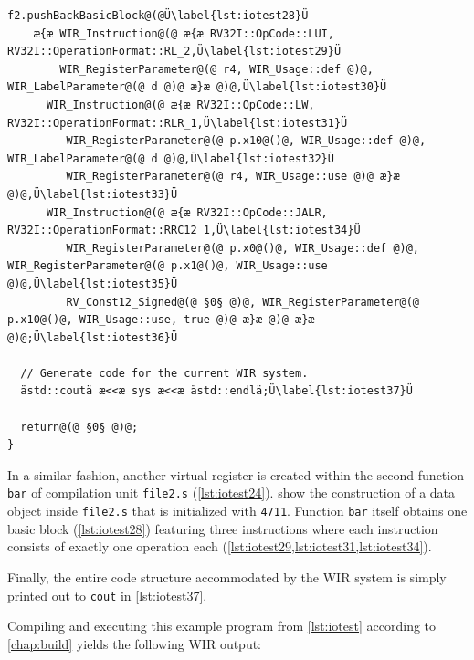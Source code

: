 \begin{lstlisting}[style=code,float=!ht,caption={Simple WIR Program Showing Stream Output},label=lst:iotest]
  f2.pushBackBasicBlock@(@Ü\label{lst:iotest28}Ü
    æ{æ WIR_Instruction@(@ æ{æ RV32I::OpCode::LUI, RV32I::OperationFormat::RL_2,Ü\label{lst:iotest29}Ü
        WIR_RegisterParameter@(@ r4, WIR_Usage::def @)@, WIR_LabelParameter@(@ d @)@ æ}æ @)@,Ü\label{lst:iotest30}Ü
      WIR_Instruction@(@ æ{æ RV32I::OpCode::LW, RV32I::OperationFormat::RLR_1,Ü\label{lst:iotest31}Ü
         WIR_RegisterParameter@(@ p.x10@()@, WIR_Usage::def @)@, WIR_LabelParameter@(@ d @)@,Ü\label{lst:iotest32}Ü
         WIR_RegisterParameter@(@ r4, WIR_Usage::use @)@ æ}æ @)@,Ü\label{lst:iotest33}Ü
      WIR_Instruction@(@ æ{æ RV32I::OpCode::JALR, RV32I::OperationFormat::RRC12_1,Ü\label{lst:iotest34}Ü
         WIR_RegisterParameter@(@ p.x0@()@, WIR_Usage::def @)@, WIR_RegisterParameter@(@ p.x1@()@, WIR_Usage::use @)@,Ü\label{lst:iotest35}Ü
         RV_Const12_Signed@(@ §0§ @)@, WIR_RegisterParameter@(@ p.x10@()@, WIR_Usage::use, true @)@ æ}æ @)@ æ}æ @)@;Ü\label{lst:iotest36}Ü

  // Generate code for the current WIR system.
  ästd::coutä æ<<æ sys æ<<æ ästd::endlä;Ü\label{lst:iotest37}Ü

  return@(@ §0§ @)@;
}
\end{lstlisting}
\clearpage

In a similar fashion, another virtual register is created within the second function \texttt{bar} of compilation unit \texttt{file2.s} (\cref{lst:iotest24}).
 show the construction of a data object inside \texttt{file2.s} that is initialized with \texttt{4711}.
Function \texttt{bar} itself obtains one basic block (\cref{lst:iotest28}) featuring three instructions where each instruction consists of exactly one operation each (\cref{lst:iotest29,lst:iotest31,lst:iotest34}).

Finally, the entire code structure accommodated by the \gls{WIR} system is simply printed out to \texttt{cout} in \cref{lst:iotest37}.

Compiling and executing this example program from \cref{lst:iotest} according to \cref{chap:build} yields the following \gls{WIR} output:

